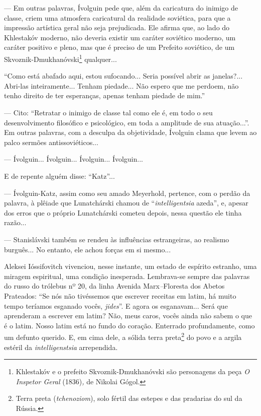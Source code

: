 --- Em outras palavras, Ívolguin pede que, além da caricatura do inimigo
de classe, criem uma atmosfera caricatural da realidade soviética, para
que a impressão artística geral não seja prejudicada. Ele afirma que, ao
lado do Khlestakóv moderno, não deveria existir um caráter soviético
moderno, um caráter positivo e pleno, mas que é preciso de um Prefeito
soviético, de um Skvoznik-Dmukhanóvski\footnote{Khlestakóv e o prefeito
  Skvoznik-Dmukhanóvski são personagens da peça \emph{O Inspetor Geral}
  (1836)\emph{,} de Nikolai Gógol.} qualquer...

``Como está abafado aqui, estou sufocando... Seria possível abrir as
janelas?... Abri-las inteiramente... Tenham piedade... Não espero que me
perdoem, não tenho direito de ter esperanças, apenas tenham piedade de
mim.''

--- Cito: ``Retratar o inimigo de classe tal como ele é, em todo o seu
desenvolvimento filosófico e psicológico, em toda a amplitude de sua
atuação...''. Em outras palavras, com a desculpa da objetividade,
Ívolguin clama que levem ao palco sermões antissoviéticos...

--- Ívolguin... Ívolguin... Ívolguin... Ívolguin...

E de repente alguém disse: ``Katz''...

--- Ívolguin-Katz, assim como seu amado Meyerhold, pertence, com o
perdão da palavra, à plêiade que Lunatchárski chamou de
``\emph{intelligentsia} azeda'', e, apesar dos erros que o próprio
Lunatchárski cometeu depois, nessa questão ele tinha razão...

--- Stanislávski também se rendeu às influências estrangeiras, ao
realismo burguês... No entanto, ele achou forças em si mesmo...

Aleksei Ióssifovitch vivenciou, nesse instante, um estado de espírito
estranho, uma miragem espiritual, uma condição inesperada. Lembrava-se
sempre das palavras do russo do trólebus nº 20, da linha Avenida
Marx\emph{--}Floresta dos Abetos Prateados: ``Se nós não tivéssemos que
escrever receitas em latim, há muito tempo teríamos esganado vocês,
\emph{jides}''. E agora os esganavam... Será que aprenderam a escrever
em latim? Não, meus caros, vocês ainda não sabem o que é o latim. Nosso
latim está no fundo do coração. Enterrado profundamente, como um defunto
querido. E, em cima dele, a sólida terra preta\footnote{Terra preta
  (\emph{tchenoziom}), solo fértil das estepes e das pradarias do sul da
  Rússia.} do povo e a argila estéril da \emph{intelligenstsia}
arrependida.

